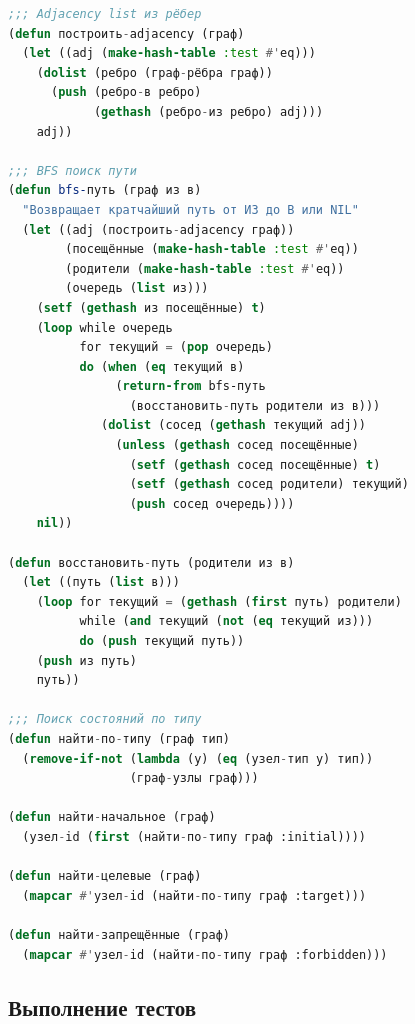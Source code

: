 \documentclass[10pt, oneside]{article}
\begin{document}
\begin{lstlisting}[language=CommonLisp,caption={BFS и анализ достижимости}]
;;; Adjacency list из рёбер
(defun построить-adjacency (граф)
  (let ((adj (make-hash-table :test #'eq)))
    (dolist (ребро (граф-рёбра граф))
      (push (ребро-в ребро)
            (gethash (ребро-из ребро) adj)))
    adj))

;;; BFS поиск пути
(defun bfs-путь (граф из в)
  "Возвращает кратчайший путь от ИЗ до В или NIL"
  (let ((adj (построить-adjacency граф))
        (посещённые (make-hash-table :test #'eq))
        (родители (make-hash-table :test #'eq))
        (очередь (list из)))
    (setf (gethash из посещённые) t)
    (loop while очередь
          for текущий = (pop очередь)
          do (when (eq текущий в)
               (return-from bfs-путь
                 (восстановить-путь родители из в)))
             (dolist (сосед (gethash текущий adj))
               (unless (gethash сосед посещённые)
                 (setf (gethash сосед посещённые) t)
                 (setf (gethash сосед родители) текущий)
                 (push сосед очередь))))
    nil))

(defun восстановить-путь (родители из в)
  (let ((путь (list в)))
    (loop for текущий = (gethash (first путь) родители)
          while (and текущий (not (eq текущий из)))
          do (push текущий путь))
    (push из путь)
    путь))

;;; Поиск состояний по типу
(defun найти-по-типу (граф тип)
  (remove-if-not (lambda (у) (eq (узел-тип у) тип))
                 (граф-узлы граф)))

(defun найти-начальное (граф)
  (узел-id (first (найти-по-типу граф :initial))))

(defun найти-целевые (граф)
  (mapcar #'узел-id (найти-по-типу граф :target)))

(defun найти-запрещённые (граф)
  (mapcar #'узел-id (найти-по-типу граф :forbidden)))
\end{lstlisting}

\subsection{Выполнение тестов}
\end{document}
